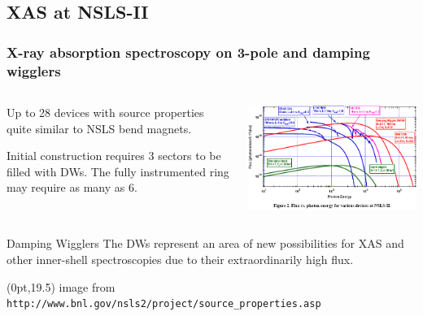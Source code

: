 \documentclass[10pt, xcolor=x11names, compress]{beamer}
\begin{document}
\subsection[XAS at NSLS-II]{XAS at NSLS-II}

\begin{frame}
  \frametitle{X-ray absorption spectroscopy on 3-pole and damping wigglers}

  \begin{columns}
    \begin{column}{0.5\linewidth}
      \begin{description}[3-]
      \item [3-pole wigglers] Up to 28 devices with source properties
        quite similar to NSLS bend magnets.
      \item [Damping Wigglers] Initial construction requires 3 sectors
        to be filled with DWs.  The fully instrumented ring may
        require as many as 6.
      \end{description}
    \end{column}
    \begin{column}{0.5\linewidth}
      \includegraphics[width=\linewidth]{pses/Src-Prop_Fig-2.png}      
    \end{column}
  \end{columns}
  \begin{block}{Damping Wigglers}
    The DWs represent an area of new possibilities for XAS and other
    inner-shell spectroscopies due to their extraordinarily high flux.
  \end{block}

  \begin{textblock*}{0.5\linewidth}(0pt,19.5\TPVertModule) 
    \tiny
    image from \texttt{http://www.bnl.gov/nsls2/project/source\_properties.asp}
  \end{textblock*}
\end{frame}
\end{document}
